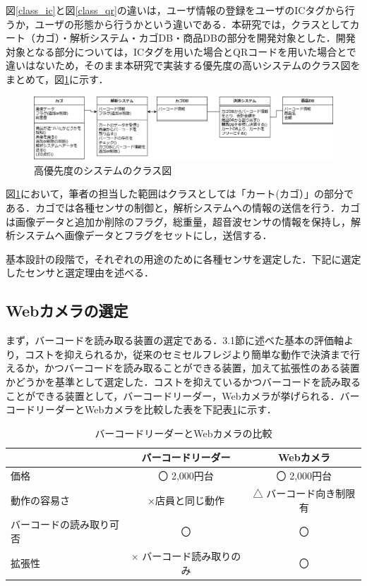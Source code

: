 図\ref{class_ic}と図\ref{class_qr}の違いは，ユーザ情報の登録をユーザのICタグから行うか，ユーザの形態から行うかという違いである．本研究では，クラスとしてカート（カゴ）・解析システム・カゴDB・商品DBの部分を開発対象とした．開発対象となる部分については，ICタグを用いた場合とQRコードを用いた場合とで違いはないため，そのまま本研究で実装する優先度の高いシステムのクラス図をまとめて，図\ref{class_qr_2}に示す．


\begin{figure}[htbp]
\centering
\includegraphics[width=15cm]{./picture/class_final.eps}
\caption{高優先度のシステムのクラス図}
\label{class_qr_2}
\end{figure}


図\ref{class_qr_2}において，筆者の担当した範囲はクラスとしては「カート(カゴ）」の部分である．カゴでは各種センサの制御と，解析システムへの情報の送信を行う．カゴは画像データと追加か削除のフラグ，総重量，超音波センサの情報を保持し，解析システムへ画像データとフラグをセットにし，送信する．

基本設計の段階で，それぞれの用途のために各種センサを選定した．下記に選定したセンサと選定理由を述べる．


\subsection{Webカメラの選定}


まず，バーコードを読み取る装置の選定である．3.1節に述べた基本の評価軸より，コストを抑えられるか，従来のセミセルフレジより簡単な動作で決済まで行えるか，かつバーコードを読み取ることができる装置，加えて拡張性のある装置かどうかを基準として選定した．コストを抑えているかつバーコードを読み取ることができる装置として，バーコードリーダー，Webカメラが挙げられる．バーコードリーダーとWebカメラを比較した表を下記表\ref{came}に示す．


\begin{table}[htb]
\begin{center}
\caption{バーコードリーダーとWebカメラの比較}
\begin{tabular}{|l|c|c|} \hline
 & バーコードリーダー & Webカメラ \\ \hline \hline
価格 & 〇 2,000円台 & 〇 2,000円台 \\
動作の容易さ & ×店員と同じ動作 & △ バーコード向き制限有 \\
バーコードの読み取り可否 & 〇 & 〇 \\
拡張性 & × バーコード読み取りのみ & 〇 \\ \hline
\end{tabular}
\label{came}
\end{center}
\end{table}


